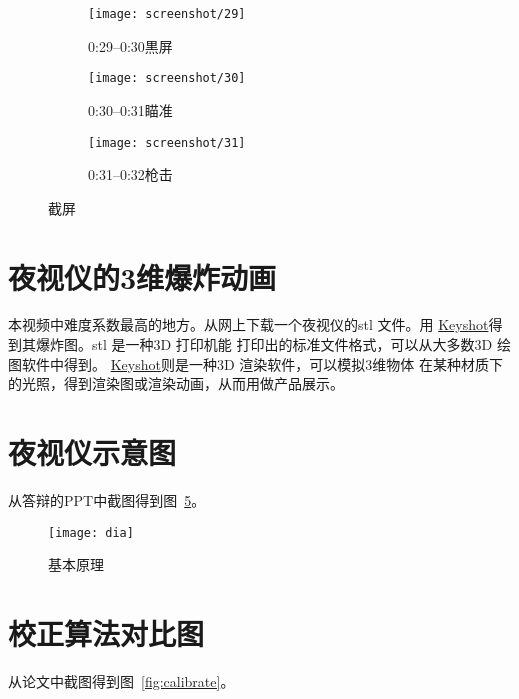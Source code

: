 \documentclass[../main]{subfiles}
\begin{document}
\begin{figure}[htbp]
  \centering
  \begin{subfigure}[htbp]{0.45\linewidth}
    \centering
    \texttt{[image: screenshot/29]}
    \caption{0:29--0:30黒屏}%
    \label{fig:screenshot/29}
  \end{subfigure}
  \quad
  \begin{subfigure}[htbp]{0.45\linewidth}
    \centering
    \texttt{[image: screenshot/30]}
    \caption{0:30--0:31瞄准}%
    \label{fig:screenshot/30}
  \end{subfigure}

  \begin{subfigure}[htbp]{0.45\linewidth}
    \centering
    \texttt{[image: screenshot/31]}
    \caption{0:31--0:32枪击}%
    \label{fig:screenshot/30}
  \end{subfigure}
  \caption{截屏}%
  \label{fig:screenshot}
\end{figure}

\section{夜视仪的3维爆炸动画}%
\label{sec:3d}

本视频中难度系数最高的地方。从网上下载一个夜视仪的stl 文件。用
\href{https://www.keyshot.com/}{Keyshot}得到其爆炸图。stl 是一种3D 打印机能
打印出的标准文件格式，可以从大多数3D 绘图软件中得到。
\href{https://www.keyshot.com/}{Keyshot}则是一种3D 渲染软件，可以模拟3维物体
在某种材质下的光照，得到渲染图或渲染动画，从而用做产品展示。

\section{夜视仪示意图}%
\label{sec:dia}

从答辩的PPT中截图得到图~\ref{fig:dia}。

\begin{figure}[htbp]
  \centering
  \texttt{[image: dia]}
  \caption{基本原理}%
  \label{fig:dia}
\end{figure}

\section{校正算法对比图}%
\label{sec:compare}

从论文中截图得到图~\ref{fig:calibrate}。
\end{document}
